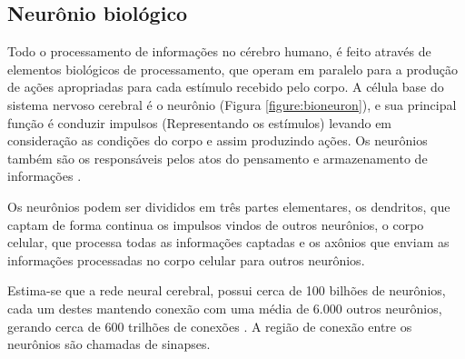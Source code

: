 \subsection{Neurônio biológico}


\par Todo o processamento de informações no cérebro humano, é feito através de elementos biológicos de processamento, que operam em paralelo para a produção de ações apropriadas para cada estímulo recebido pelo corpo. A célula base do sistema nervoso cerebral é o neurônio (Figura \ref{figure:bioneuron}), e sua principal função é conduzir impulsos (Representando os estímulos) levando em consideração as condições do corpo e assim produzindo ações. Os neurônios também são os responsáveis pelos atos do pensamento e armazenamento de informações \cite{livroNunes2016}.

\par Os neurônios podem ser divididos em três partes elementares, os dendritos, que captam de forma continua os impulsos vindos de outros neurônios, o corpo celular, que processa todas as informações captadas e os axônios que enviam as informações processadas no corpo celular para outros neurônios.


\par Estima-se que a rede neural cerebral, possui cerca de 100 bilhões de neurônios, cada um destes mantendo conexão com uma média de 6.000 outros neurônios, gerando cerca de 600 trilhões de conexões \cite{shepherdgordonm1990}. A região de conexão entre os neurônios são chamadas de sinapses.



